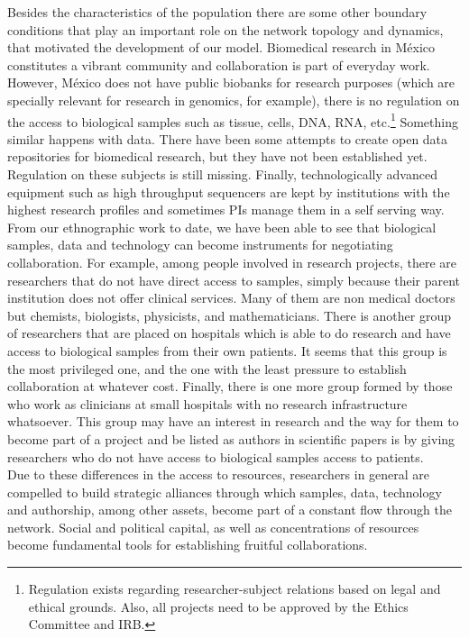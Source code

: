 \documentclass[11pt]{article}
\begin{document}
Besides the characteristics of the population there are some other boundary
conditions that play an important role on the network topology and dynamics,
that motivated the development of our model. Biomedical research in M\'exico
constitutes a vibrant community and collaboration is part of everyday
work. However, M\'exico does not have public biobanks for research purposes
(which are specially relevant for research in genomics, for example), there is
no regulation on the access to biological samples such as tissue, cells, DNA,
RNA, etc.\footnote{Regulation exists regarding researcher-subject relations
  based on legal and ethical grounds. Also, all projects need to be approved by
  the Ethics Committee and IRB.} Something similar happens with data. There have
been some attempts to create open data repositories for biomedical research, but
they have not been established yet. Regulation on these subjects is still
missing. Finally, technologically advanced equipment such as high throughput sequencers
are kept by institutions with the highest research
profiles and sometimes PIs manage them in a self serving way.\\  

From our ethnographic work to date, we have been able to see that
biological samples, data and technology can become instruments for negotiating
collaboration. For example, among people involved in research projects, there
are researchers that do not have direct access to samples, simply because their
parent institution does not offer clinical services. Many of them are non medical
doctors but chemists, biologists, physicists, and mathematicians. There is
another group of researchers that are placed on hospitals which is able to do
research and have access to biological samples from their own patients. It seems
that this group is the most privileged one, and the one with the least pressure to establish
collaboration at whatever cost. Finally, there is one more group formed by those
who work as clinicians at small hospitals with no research infrastructure
whatsoever. This group may have an interest in research and the way for them to
become part of a project and be listed as authors in scientific papers is by
giving researchers who do not have access to biological samples access to
patients.\\

Due to these differences in the access to resources, researchers in
general are compelled to build strategic alliances through which samples, data,
technology and authorship, among other assets, become part of a constant flow through
the network. Social and political capital, as well as concentrations of
resources become fundamental tools for establishing fruitful collaborations. 
\end{document}

